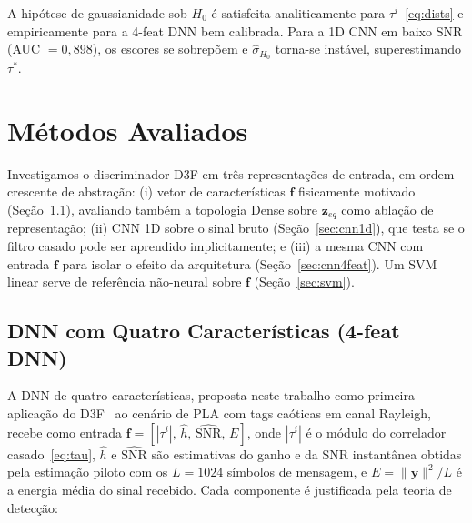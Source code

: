 \documentclass{sbrt}
\begin{document}
A hipótese de gaussianidade sob $H_0$ é satisfeita analiticamente para $\tau^i$~\eqref{eq:dists} e empiricamente para a 4-feat DNN bem calibrada. Para a 1D CNN em baixo SNR (AUC $= 0{,}898$), os escores se sobrepõem e $\hat{\sigma}_{H_0}$ torna-se instável, superestimando $\tau^*$.


\section{Métodos Avaliados}

Investigamos o discriminador D3F em três representações de entrada, em ordem crescente de abstração: (i) vetor de características $\mathbf{f}$ fisicamente motivado (Seção~\ref{sec:dnn4feat}), avaliando também a topologia Dense sobre $\mathbf{z}_{eq}$ como ablação de representação; (ii) CNN 1D sobre o sinal bruto (Seção~\ref{sec:cnn1d}), que testa se o filtro casado pode ser aprendido implicitamente; e (iii) a mesma CNN com entrada $\mathbf{f}$ para isolar o efeito da arquitetura (Seção~\ref{sec:cnn4feat}). Um SVM linear serve de referência não-neural sobre $\mathbf{f}$ (Seção~\ref{sec:svm}).

\subsection{DNN com Quatro Características (4-feat DNN)}\label{sec:dnn4feat}

A DNN de quatro características, proposta neste trabalho como primeira aplicação do D3F~\cite{ref_braca} ao cenário de PLA com tags caóticas em canal Rayleigh, recebe como entrada $\mathbf{f} = [|\tau^i|,\, \hat{h},\, \widehat{\text{SNR}},\, E]$, onde $|\tau^i|$ é o módulo do correlador casado~\eqref{eq:tau}, $\hat{h}$ e $\widehat{\text{SNR}}$ são estimativas do ganho e da SNR instantânea obtidas pela estimação piloto com os $L = 1024$ símbolos de mensagem, e $E = \|\mathbf{y}\|^2/L$ é a energia média do sinal recebido. Cada componente é justificada pela teoria de detecção:
\end{document}
